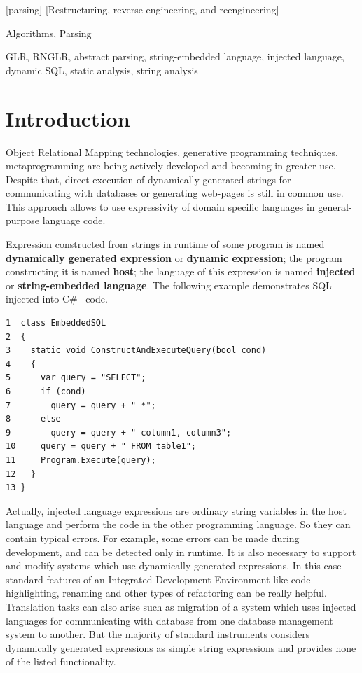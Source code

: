 \documentclass{sigplanconf}
\begin{document}
[parsing]
[Restructuring, reverse engineering, and reengineering]


\terms
Algorithms, Parsing

\keywords
GLR, RNGLR, abstract parsing, string-embedded language, injected language, dynamic SQL, static analysis, string 
analysis

\section{Introduction}

Object Relational Mapping technologies, generative programming techniques, metaprogramming are being actively developed and becoming in greater use. Despite that, direct execution of dynamically generated strings for communicating with databases or generating web-pages is still in common use. This approach allows to use expressivity of domain specific languages in general-purpose language code.

Expression constructed from strings in runtime of some program is named {\bf dynamically generated expression} or {\bf dynamic expression}; the program constructing it is named {\bf host}; the language of this expression is named {\bf injected} or {\bf string-embedded language}. The following example demonstrates SQL injected into C\# \ code. 

\begin{verbatim}
1  class EmbeddedSQL 
2  {
3    static void ConstructAndExecuteQuery(bool cond)
4    {
5  	   var query = "SELECT";
6      if (cond)
7        query = query + " *"; 
8      else
9        query = query + " column1, column3";
10     query = query + " FROM table1";
11     Program.Execute(query);
12   }
13 }
\end{verbatim}

Actually, injected language expressions are ordinary string variables in the host language and perform the code in the other programming language. So they can contain typical errors. For example, some errors can be made during development, and can be detected only in runtime. It is also necessary to support and modify systems which use dynamically generated expressions. In this case standard features of an Integrated Development Environment like code highlighting, renaming and other types of refactoring can be really helpful. Translation tasks can also arise such as migration of a system which uses injected languages for communicating with database from one database management system to another. But the majority of standard instruments considers dynamically generated expressions as simple string expressions and provides none of the listed functionality.
\end{document}
